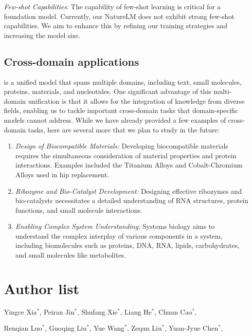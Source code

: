{\em Few-shot Capabilities}: The capability of few-shot learning is critical for a foundation model. Currently, our NatureLM does not exhibit strong few-shot capabilities. We aim to enhance this by refining our training strategies and increasing the model size.

\subsection{Cross-domain applications}
\ourM{} is a unified model that spans multiple domains, including text, small molecules, proteins, materials, and nucleotides. One significant advantage of this multi-domain unification is that it allows for the integration of knowledge from diverse fields, enabling us to tackle important cross-domain tasks that domain-specific models cannot address. While we have already provided a few examples of cross-domain tasks, here are several more that we plan to study in the future:
\begin{enumerate}
\item \emph{Design of Biocompatible Materials:} Developing biocompatible materials requires the simultaneous consideration of material properties and protein interactions. Examples included the Titanium Alloys and Cobalt-Chromium Alloys used in hip replacement.
\item \emph{Ribozyme and Bio-Catalyst Development:} Designing effective ribozymes and bio-catalysts necessitates a detailed understanding of RNA structures, protein functions, and small molecule interactions.
\item \emph{Enabling Complex System Understanding:} Systems biology aims to understand the complex interplay of various components in a system, including biomolecules such as proteins, DNA, RNA, lipids, carbohydrates, and small molecules like metabolites.
\end{enumerate}



\clearpage

\section*{Author list}\label{sec:authorlist}
Yingce Xia$^{*}$, Peiran Jin$^{*}$, Shufang Xie$^{*}$, Liang He$^{*}$, Chuan Cao$^{*}$, 

Renqian Luo$^{*}$, Guoqing Liu$^{*}$, Yue Wang$^{*}$, Zequn Liu$^{*}$, Yuan-Jyue Chen$^{*}$, 

